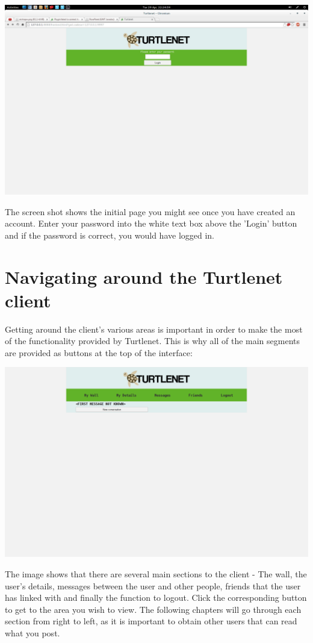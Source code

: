\includegraphics[scale=0.2]{../Screenshots/Screenshot from 2014-04-29 22-24-59}

The screen shot shows the initial page you might see once you have created an
account.  Enter your password into the white text box above the 'Login' button
and if the password is correct, you would have logged in.

\section{Navigating around the Turtlenet client}
Getting around the client's various areas is important in order to make the most
of the functionality provided by Turtlenet.  This is why all of the main
segments are provided as buttons at the top of the interface:

\includegraphics[scale=0.2]{../Screenshots/Screenshot from 2014-04-29 22-31-38}

The image shows that there are several main sections to the client - The wall,
the user's details, messages between the user and other people, friends that the
user has linked with and finally the function to logout.  Click the
corresponding button to get to the area you wish to view.  The following
chapters will go through each section from right to left, as it is important to
obtain other users that can read what you post.

